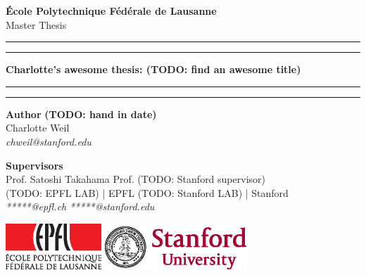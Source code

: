 
\begin{titlingpage}
\begin{center}
\Large
\textbf{École Polytechnique Fédérale de Lausanne} \\
\vspace{1cm}
Master Thesis
\vspace{2cm}
\hrule
\vspace{0.1cm}
\hrule
\vspace{1cm}
\Huge
\textbf{Charlotte's awesome thesis: (TODO: find an awesome title)} \\
\vspace{1cm}
\hrule
\vspace{0.1cm}
\hrule
\end{center}
\vfill
\noindent \textbf{Author} \hfill \textbf{(TODO: hand in date)} \\
Charlotte Weil \\
\textit{chweil@stanford.edu} \\
\vspace{0.5cm}

\noindent \textbf{Supervisors} \\
Prof. Satoshi Takahama          \hfill    Prof. (TODO: Stanford supervisor) \\
(TODO: EPFL LAB) | EPFL      \hfill    (TODO: Stanford LAB) | Stanford \\
\textit{*****@epfl.ch} \hfill    \textit{*****@stanford.edu} \\
\vspace{0.8cm}

\noindent
\includegraphics[width=0.27\textwidth]{images/epfl-logo.eps}
\hfill
\includegraphics[width=0.4\textwidth]{images/stanford-logo.eps}

\end{titlingpage}

